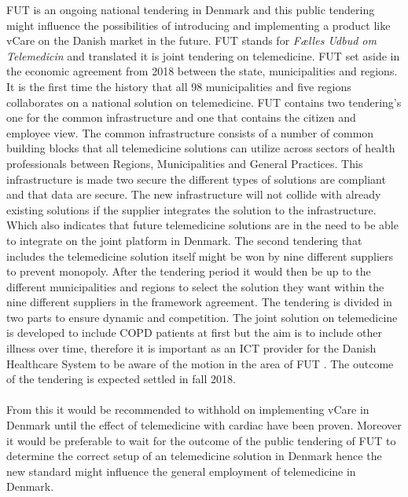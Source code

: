 FUT is an ongoing national tendering in Denmark and this public tendering might influence the possibilities of introducing and implementing a product like vCare on the Danish market in the future. FUT stands for \textit{Fælles Udbud om Telemedicin} and translated it is joint tendering on telemedicine. FUT set aside in the economic agreement from 2018 between the state, municipalities and regions. It is the first time the history that all 98 municipalities and five regions collaborates on a national solution on telemedicine. 
FUT contains two tendering's one for the common infrastructure and one that contains the citizen and employee view. 
The common infrastructure consists of a number of common building blocks that all telemedicine solutions can utilize across sectors of health professionals between Regions, Municipalities and General Practices. This infrastructure is made two secure the different types of solutions are compliant and that data are secure. The new infrastructure will not collide with already existing solutions if the supplier integrates the solution to the infrastructure. Which also indicates that future telemedicine solutions are in the need to be able to integrate on the joint platform in Denmark. 
The second tendering that includes the telemedicine solution itself might be won by nine different suppliers to prevent monopoly. After the tendering period it would then be up to the different municipalities and regions to select the solution they want within the nine different suppliers in the framework agreement. 
The tendering is divided in two parts to ensure dynamic and competition. 	
The joint solution on telemedicine is developed to include COPD patients at first but the aim is to include other illness over time, therefore it is important as an ICT provider for the Danish Healthcare System to be aware of the motion in the area of FUT \cite{FUT, FUT2}. The outcome of the tendering is expected settled in fall 2018. \\
\\


From this it would be recommended to withhold on implementing vCare in Denmark until the effect of telemedicine with cardiac have been proven. Moreover it would be preferable to wait for the outcome of the public tendering of FUT to determine the correct setup of an telemedicine solution in Denmark hence the new standard might influence the general employment of telemedicine in Denmark. 





